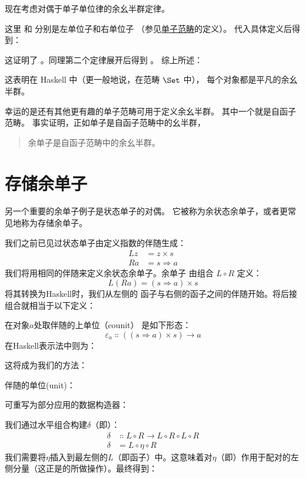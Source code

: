 现在考虑对偶于单子单位律的余幺半群定律。

这里  和  分别是左单位子和右单位子
（参见\hyperref[monads-categorically]{单子范畴}的定义）。
代入具体定义后得到：

这证明了 。同理第二个定律展开后得到 。
综上所述：

这表明在 Haskell 中（更一般地说，在范畴 $\Set$ 中），
每个对象都是平凡的余幺半群。

幸运的是还有其他更有趣的单子范畴可用于定义余幺半群。
其中一个就是自函子范畴。
事实证明，正如单子是自函子范畴中的幺半群，

\begin{quote}
  余单子是自函子范畴中的余幺半群。
\end{quote}

\section{存储余单子}

另一个重要的余单子例子是状态单子的对偶。
它被称为余状态余单子，或者更常见地称为存储余单子。

我们之前已见过状态单子由定义指数的伴随生成：
\begin{align*}
  L z & = z\times{}s      \\
  R a & = s \Rightarrow a
\end{align*}
我们将用相同的伴随来定义余状态余单子。余单子
由组合 $L \circ R$ 定义：
$$L (R a) = (s \Rightarrow a)\times{}s$$
将其转换为Haskell时，我们从左侧的
函子与右侧的函子之间的伴随开始。将后接组合就相当于以下定义：

在对象$a$处取伴随的上单位（counit）
是如下形态：
$$\varepsilon_a \Colon ((s \Rightarrow a)\times{}s) \to a$$
在Haskell表示法中则为：

这将成为我们的方法：

伴随的单位(unit)：

可重写为部分应用的数据构造器：

我们通过水平组合构建$\delta$（即）：
\begin{align*}
  \delta & \Colon L \circ R \to L \circ R \circ L \circ R \\
  \delta & = L \circ \eta \circ R
\end{align*}
我们需要将$\eta$插入到最左侧的$L$（即函子）中。这意味着对$\eta$（即）作用于配对的左侧分量（这正是的所做操作）。最终得到：

